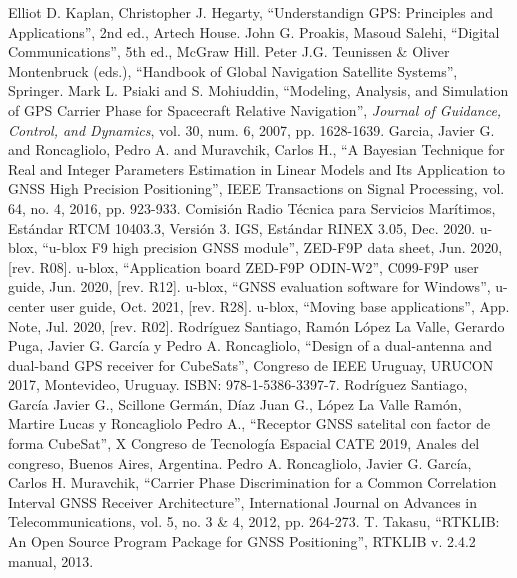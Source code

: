 \documentclass[a4paper,12pt,oneside,onecolumn,final,openright]{book}%
\begin{document}
\begin{thebibliography}{00}
 Elliot D. Kaplan, Christopher J. Hegarty, ``Understandign GPS: Principles and Applications'', 2nd ed., Artech House.
 John G. Proakis, Masoud Salehi, ``Digital Communications'', 5th ed., McGraw Hill.
 Peter J.G. Teunissen \& Oliver Montenbruck (eds.), ``Handbook of Global Navigation Satellite Systems'', Springer.
 Mark L. Psiaki and S. Mohiuddin, ``Modeling, Analysis, and Simulation of GPS Carrier Phase for Spacecraft Relative Navigation'', \textit{Journal of Guidance, Control, and Dynamics}, vol. 30, num. 6, 2007, pp. 1628-1639.
 Garcia, Javier G. and Roncagliolo, Pedro A. and Muravchik, Carlos H., ``A Bayesian Technique for Real and Integer Parameters Estimation in Linear Models and Its Application to GNSS High Precision Positioning'', IEEE Transactions on Signal Processing, vol. 64, no. 4, 2016, pp. 923-933.
 Comisión Radio Técnica para Servicios Marítimos, Estándar RTCM 10403.3, Versión 3.
 IGS, Estándar RINEX 3.05, Dec. 2020.
 u-blox, ``u-blox F9 high precision GNSS module'', ZED-F9P data sheet, Jun. 2020, [rev. R08].
 u-blox, ``Application board ZED-F9P ODIN-W2'', C099-F9P user guide, Jun. 2020, [rev. R12].
 u-blox, ``GNSS evaluation software for Windows'', u-center user guide, Oct. 2021, [rev. R28].
 u-blox, ``Moving base applications'', App. Note, Jul. 2020, [rev. R02].
 Rodríguez Santiago, Ramón López La Valle, Gerardo Puga, Javier G. García y Pedro A. Roncagliolo, ``Design of a dual-antenna and dual-band GPS receiver for CubeSats'', Congreso de IEEE Uruguay, URUCON 2017, Montevideo, Uruguay. ISBN: 978-1-5386-3397-7.
 Rodríguez Santiago, García Javier G., Scillone Germán, Díaz Juan G., López La Valle Ramón, Martire Lucas y Roncagliolo Pedro A., ``Receptor GNSS satelital con factor de forma CubeSat'', X Congreso de Tecnología Espacial CATE 2019, Anales del congreso, Buenos Aires, Argentina.
 Pedro A. Roncagliolo, Javier G. García, Carlos H. Muravchik, ``Carrier Phase Discrimination for a Common Correlation Interval GNSS Receiver Architecture'', International Journal on Advances in Telecommunications, vol. 5, no. 3 \& 4, 2012, pp. 264-273.
 T. Takasu, ``RTKLIB: An Open Source Program Package for GNSS Positioning'', RTKLIB v. 2.4.2 manual, 2013.
\end{thebibliography}
\end{document}
